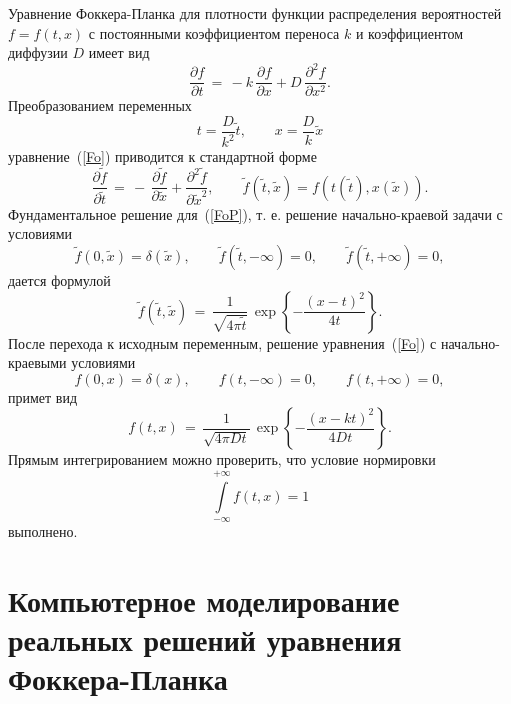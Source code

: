 \documentclass[a4paper]{report}
\begin{document}
Уравнение Фоккера-Планка для плотности функции распределения
вероятностей $f = f(t,x)$ с постоянными коэффициентом переноса $k$ и
коэффициентом диффузии $ D$ имеет вид
\begin{equation}\label{Fo}
\frac{\partial{f}}{\partial{t}}\,=\, -k\,\frac{\partial{f}}{\partial{x}}+ D\,\frac{\partial^2{f}}{\partial{x}^2}.
\end{equation}
Преобразованием переменных
\begin{equation}\label{}
t= \frac{D}{k^2}\tilde{t},\qquad x= \frac{D}{k}\tilde{x}
\nonumber
\end{equation}
уравнение~(\ref{Fo}) приводится к стандартной форме
\begin{equation}\label{FoP}
\frac{\partial{\tilde{f}}}{\partial{\tilde{t}}}\,=\, -\,\frac{\partial{\tilde{f}}}{\partial{\tilde{x}}}+ \frac{\partial^2{\tilde{f}}}{\partial{\tilde{x}}^2},\qquad \tilde{f}(\tilde{t},\tilde{x})= f(t(\tilde{t}),x(\tilde{x})).
\end{equation}
Фундаментальное решение для~(\ref{FoP}), т. е. решение начально-краевой задачи с условиями
\begin{equation}\label{}
\tilde{f}(0,\tilde{x})= \delta(\tilde{x}),\qquad \tilde{f}(\tilde{t},-\infty)= 0,\qquad \tilde{f}(\tilde{t},+\infty)= 0,
\nonumber
\end{equation}
дается формулой ~\cite{Tihonov1999}
\begin{equation}\label{}
\tilde{f}(\tilde{t},\tilde{x})\,=\, \frac{1}{\sqrt{4\pi\tilde{t}}}\, \exp\left\{-\frac{(x-t)^2}{4t}\right\}.
\nonumber
\end{equation}
После перехода к исходным переменным, решение уравнения~(\ref{Fo}) с
начально-краевыми условиями
\begin{equation}\label{}
f(0,x)= \delta(x),\qquad f(t,-\infty)= 0,\qquad f(t,+\infty)= 0,
\nonumber
\end{equation}
примет вид
\begin{equation}\label{FoP3}
f(t,x)\,=\, \frac{1}{\sqrt{4\pi{}Dt}}\, \exp\left\{-\frac{(x-kt)^2}{4Dt}\right\}.
\end{equation}
Прямым интегрированием можно проверить, что условие нормировки
\begin{equation}\label{}
\int\limits_{-\infty}^{+\infty}f(t,x)= 1
\nonumber
\end{equation}
выполнено.


\section{Компьютерное моделирование реальных решений уравнения Фоккера-Планка}
\end{document}
